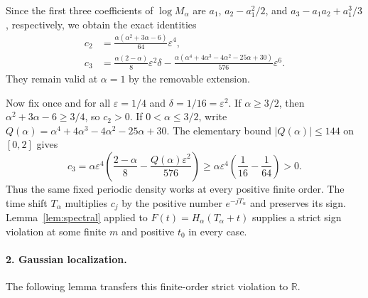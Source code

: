 \documentclass[11pt]{article}
\newcommand{\R}{\mathbb R}
\begin{document}
Since the first three coefficients of $\log M_\alpha$ are $a_1$, $a_2-a_1^2/2$, and $a_3-a_1a_2+a_1^3/3$, respectively, we obtain the exact identities
\begin{align}
 c_2&=\frac{\alpha(\alpha^2+3\alpha-6)}{64}\varepsilon^4,\label{eq:c2}\\
 c_3&=\frac{\alpha(2-\alpha)}8\varepsilon^2\delta
 -\frac{\alpha(\alpha^4+4\alpha^3-4\alpha^2-25\alpha+30)}{576}\varepsilon^6.\label{eq:c3}
\end{align}
They remain valid at $\alpha=1$ by the removable extension.

Now fix once and for all $\varepsilon=1/4$ and $\delta=1/16=\varepsilon^2$. If $\alpha\ge3/2$, then $\alpha^2+3\alpha-6\ge3/4$, so $c_2>0$. If $0<\alpha\le3/2$, write $Q(\alpha)=\alpha^4+4\alpha^3-4\alpha^2-25\alpha+30$. The elementary bound $|Q(\alpha)|\le144$ on $[0,2]$ gives
\[
 c_3=\alpha\varepsilon^4\left(\frac{2-\alpha}{8}-\frac{Q(\alpha)\varepsilon^2}{576}\right)
 \ge\alpha\varepsilon^4\left(\frac1{16}-\frac1{64}\right)>0.
\]
Thus the same fixed periodic density works at every positive finite order. The time shift $T_\alpha$ multiplies $c_j$ by the positive number $e^{-jT_\alpha}$ and preserves its sign. Lemma~\ref{lem:spectral} applied to $F(t)=H_\alpha(T_\alpha+t)$ supplies a strict sign violation at some finite $m$ and positive $t_0$ in every case.

\paragraph{2. Gaussian localization.}
The following lemma transfers this finite-order strict violation to $\R$.
\end{document}
